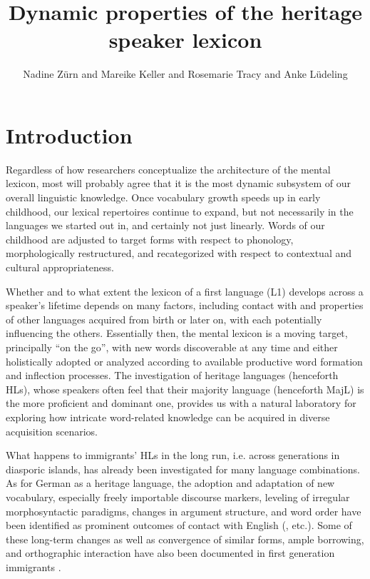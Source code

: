\documentclass[output=paper,colorlinks,citecolor=brown]{langscibook}
\title{Dynamic properties of the heritage speaker lexicon}
\author{    Nadine Zürn\orcid{0000-0003-4180-5414}\affiliation{University of Mannheim}    and  Mareike Keller\orcid{0000-0001-8054-1701}\affiliation{University of Mannheim}     and Rosemarie Tracy\orcid{0000-0002-6683-3481}\affiliation{University of Mannheim}      and Anke Lüdeling\orcid{0000-0001-5944-4595}\affiliation{Humboldt-Universität zu Berlin}}
\begin{document}
\maketitle


\section{Introduction} \label{sec:kelleretal:intro}

Regardless of how researchers conceptualize the architecture of the mental lexicon, most will probably agree that it is the most dynamic subsystem of our overall linguistic knowledge. Once vocabulary growth speeds up in early childhood, our lexical repertoires continue to expand, but not necessarily in the languages we started out in, and certainly not just linearly. Words of our childhood are adjusted to target forms with respect to phonology, morphologically restructured, and recategorized with respect to contextual and cultural appropriateness.  

Whether and to what extent the lexicon of a first language (L1) develops across a speaker's lifetime  depends on many factors, including contact with and properties of other languages acquired from birth or later on, with each potentially influencing the others. Essentially then, the mental lexicon is a moving target, principally ``on the go'', with new words discoverable at any time and either holistically adopted or analyzed according to available productive word formation and inflection processes. The investigation of heritage languages (henceforth HLs), whose speakers often feel that their majority language (henceforth MajL) is the more proficient and dominant one, provides us with a natural laboratory for exploring how intricate word-related knowledge can be acquired in diverse acquisition scenarios.

What happens to immigrants' HLs in the long run, i.e. across generations in diasporic islands, has already been investigated for many language combinations. As for German as a heritage language, the adoption and adaptation of new vocabulary, especially freely importable discourse markers, leveling of irregular morphosyntactic paradigms, changes in argument structure, and word order have been identified as prominent outcomes of contact with English (\citealt{Matras1998Utterance, Muysken2000Bilingual, Fuller2001Detachability, Clyne2003Dynamic, Boas2009, Boas2010DiscourseMarkers, Muysken2013Outcomes, PutnamSalmons2013PassiveVoice, Riehl2014Einführung,HoppPutnam2015,Stolberg2015Changes, ZimmerEtAl2020Korpus}, etc.). Some of these long-term changes as well as convergence of similar forms, ample borrowing, and orthographic interaction have also been documented in first generation immigrants \citep{Tracy2001Contact,Clyne2003Dynamic,Schmid2011,Keller2014,Tracy2022Gemischtsprachiges}.
\end{document}
